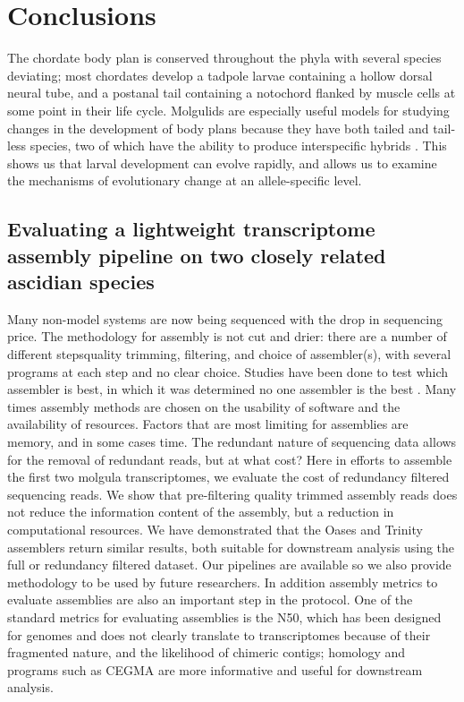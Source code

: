 \chapter{Conclusions}
The chordate body plan is conserved throughout the phyla with several species deviating; most chordates develop a tadpole larvae containing a hollow dorsal neural tube, and a postanal tail containing a notochord flanked by muscle cells at some point in their life cycle. %
Molgulids are especially useful models for studying changes in the development of body plans because they have both tailed and tail-less species, two of which have the ability to produce interspecific hybrids \cite{swalla_interspecific_1990}. This shows us that larval development can evolve rapidly, and allows us to examine the mechanisms of evolutionary change at an allele-specific level.

\section{Evaluating a lightweight transcriptome assembly pipeline on two closely related ascidian species}
Many non-model systems are now being sequenced with the drop in sequencing price. The methodology for assembly is not cut and drier: there are a number of different steps\textemdash quality trimming, filtering, and choice of assembler(s), with several programs at each step and no clear choice. Studies have been done to test which assembler is best, in which it was determined no one assembler is the best \cite{clarke_comparative_2013}. Many times assembly methods are chosen on the usability of software and the availability of resources. Factors that are most limiting for assemblies are memory, and in some cases time. The redundant nature of sequencing data allows for the removal of redundant reads, but at what cost? Here in efforts to assemble the first two molgula transcriptomes, we evaluate the cost of redundancy filtered sequencing reads. We show that pre-filtering quality trimmed assembly reads does not reduce the information content of the assembly, but a reduction in computational resources. We have demonstrated that the Oases and Trinity assemblers return similar results, both suitable for downstream analysis using the full or redundancy filtered dataset. Our pipelines are available so we also provide methodology to be used by future researchers. In addition assembly metrics to evaluate assemblies are also an important step in the protocol. One of the standard metrics for evaluating assemblies is the N50, which has been designed for genomes and does not clearly translate to transcriptomes because of their fragmented nature, and the likelihood of chimeric contigs; homology and programs such as CEGMA are more informative and useful for downstream analysis. %
 
